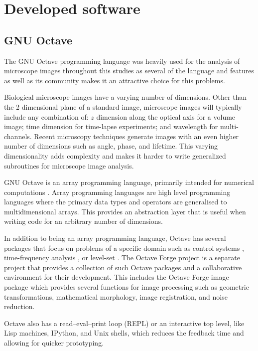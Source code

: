 \chapter{Developed software}

\section{GNU Octave}

The GNU Octave programming language was heavily used for the analysis
of microscope images throughout this studies as several of the
language and features as well as its community makes it an attractive
choice for this problems.

Biological microscope images have a varying number of dimensions.
Other than the 2 dimensional plane of a standard image, microscope
images will typically include any combination of: $z$ dimension along
the optical axis for a volume image; time dimension for time-lapse
experiments; and wavelength for multi-channels.  Recent microscopy
techniques generate images with an even higher number of dimensions
such as angle, phase, and lifetime.  This varying dimensionality adds
complexity and makes it harder to write generalized subroutines for
microscope image analysis.

GNU Octave is an array programming language, primarily intended for
numerical computations \citep{octave}.  Array programming languages
are high level programming languages where the primary data types and
operators are generalised to multidimensional arrays.  This provides
an abstraction layer that is useful when writing code for an arbitrary
number of dimensions.

In addition to being an array programming language, Octave has several
packages that focus on problems of a specific domain such as control
systems \citep{octave-control}, time-frequency analysis
\citep{octave-ltfat}, or level-set \citep{octave-level-set}.  The
Octave Forge project is a separate project that provides a collection
of such Octave packages and a collaborative environment for their
development.  This includes the Octave Forge image package which
provides several functions for image processing such as geometric
transformations, mathematical morphology, image registration, and
noise reduction.

Octave also has a read–eval–print loop (REPL) or an interactive top
level, like Lisp machines, IPython, and Unix shells, which reduces the
feedback time and allowing for quicker prototyping.

